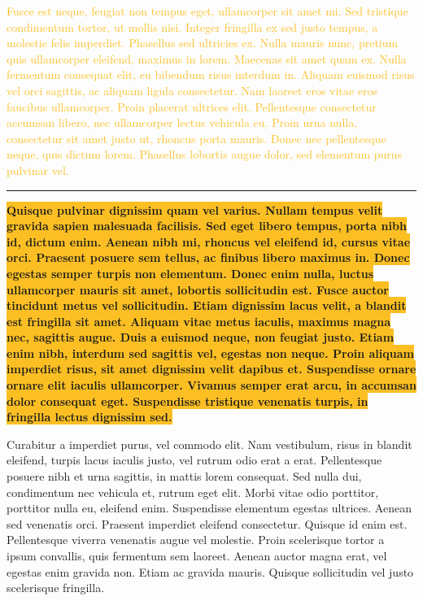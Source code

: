 \documentclass[12pt,a4paper]{article}%
\begin{document}
%
\normalsize%
\begin{justify}%
\textcolor[HTML]{fbbf24}{Fusce est neque, feugiat non tempus eget, ullamcorper sit amet mi. Sed tristique condimentum tortor, ut mollis nisi. Integer fringilla ex sed justo tempus, a molestie felis imperdiet. Phasellus sed ultricies ex. Nulla mauris nunc, pretium quis ullamcorper eleifend, maximus in lorem. Maecenas sit amet quam ex. Nulla fermentum consequat elit, eu bibendum risus interdum in. Aliquam euismod risus vel orci sagittis, ac aliquam ligula consectetur. Nam laoreet eros vitae eros faucibus ullamcorper. Proin placerat ultrices elit. Pellentesque consectetur accumsan libero, nec ullamcorper lectus vehicula eu. Proin urna nulla, consectetur sit amet justo ut, rhoncus porta mauris. Donec nec pellentesque neque, quis dictum lorem. Phasellus lobortis augue dolor, sed elementum purus pulvinar vel.}%
\end{justify}%
\par\noindent\rule{\textwidth}{0.5pt} %
\colorbox[HTML]{fbbf24}{\textbf{Quisque pulvinar dignissim quam vel varius. Nullam tempus velit gravida sapien malesuada facilisis. Sed eget libero tempus, porta nibh id, dictum enim. Aenean nibh mi, rhoncus vel eleifend id, cursus vitae orci. Praesent posuere sem tellus, ac finibus libero maximus in. Donec egestas semper turpis non elementum. Donec enim nulla, luctus ullamcorper mauris sit amet, lobortis sollicitudin est. Fusce auctor tincidunt metus vel sollicitudin. Etiam dignissim lacus velit, a blandit est fringilla sit amet. Aliquam vitae metus iaculis, maximus magna nec, sagittis augue. Duis a euismod neque, non feugiat justo. Etiam enim nibh, interdum sed sagittis vel, egestas non neque. Proin aliquam imperdiet risus, sit amet dignissim velit dapibus et. Suspendisse ornare ornare elit iaculis ullamcorper. Vivamus semper erat arcu, in accumsan dolor consequat eget. Suspendisse tristique venenatis turpis, in fringilla lectus dignissim sed.}}%
\begin{justify}%
Curabitur a imperdiet purus, vel commodo elit. Nam vestibulum, risus in blandit eleifend, turpis lacus iaculis justo, vel rutrum odio erat a erat. Pellentesque posuere nibh et urna sagittis, in mattis lorem consequat. Sed nulla dui, condimentum nec vehicula et, rutrum eget elit. Morbi vitae odio porttitor, porttitor nulla eu, eleifend enim. Suspendisse elementum egestas ultrices. Aenean sed venenatis orci. Praesent imperdiet eleifend consectetur. Quisque id enim est. Pellentesque viverra venenatis augue vel molestie. Proin scelerisque tortor a ipsum convallis, quis fermentum sem laoreet. Aenean auctor magna erat, vel egestas enim gravida non. Etiam ac gravida mauris. Quisque sollicitudin vel justo scelerisque fringilla.%
\end{justify}%
\pagebreak%
%
\end{document}
